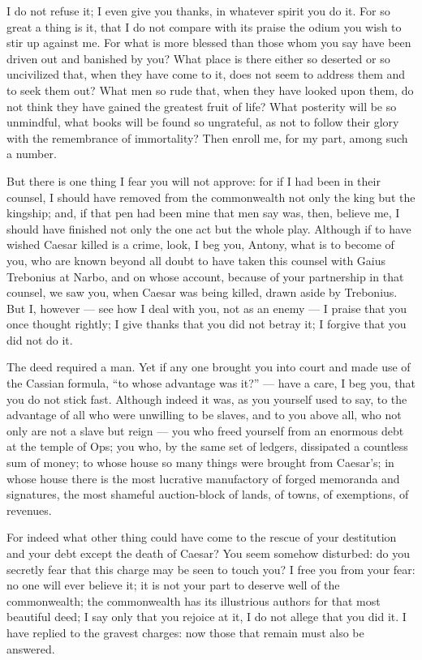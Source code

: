  I do not refuse it; I even give you thanks, in whatever spirit you do it. For so great a thing is it, that I do not compare with its praise the odium you wish to stir up against me. For what is more blessed than those whom you say have been driven out and banished by you? What place is there either so deserted or so uncivilized that, when they have come to it, does not seem to address them and to seek them out? What men so rude that, when they have looked upon them, do not think they have gained the greatest fruit of life? What posterity will be so unmindful, what books will be found so ungrateful, as not to follow their glory with the remembrance of immortality? Then enroll me, for my part, among such a number.

 But there is one thing I fear you will not approve: for if I had been in their counsel, I should have removed from the commonwealth not only the king but the kingship; and, if that pen had been mine that men say was, then, believe me, I should have finished not only the one act but the whole play. Although if to have wished Caesar killed is a crime, look, I beg you, Antony, what is to become of you, who are known beyond all doubt to have taken this counsel with Gaius Trebonius at Narbo, and on whose account, because of your partnership in that counsel, we saw you, when Caesar was being killed, drawn aside by Trebonius. But I, however --- see how I deal with you, not as an enemy --- I praise that you once thought rightly; I give thanks that you did not betray it; I forgive that you did not do it.

 The deed required a man. Yet if any one brought you into court and made use of the Cassian formula, ``to whose advantage was it?'' --- have a care, I beg you, that you do not stick fast. Although indeed it was, as you yourself used to say, to the advantage of all who were unwilling to be slaves, and to you above all, who not only are not a slave but reign --- you who freed yourself from an enormous debt at the temple of Ops; you who, by the same set of ledgers, dissipated a countless sum of money; to whose house so many things were brought from Caesar's; in whose house there is the most lucrative manufactory of forged memoranda and signatures, the most shameful auction-block of lands, of towns, of exemptions, of revenues.

 For indeed what other thing could have come to the rescue of your destitution and your debt except the death of Caesar? You seem somehow disturbed: do you secretly fear that this charge may be seen to touch you? I free you from your fear: no one will ever believe it; it is not your part to deserve well of the commonwealth; the commonwealth has its illustrious authors for that most beautiful deed; I say only that you rejoice at it, I do not allege that you did it. I have replied to the gravest charges: now those that remain must also be answered.

